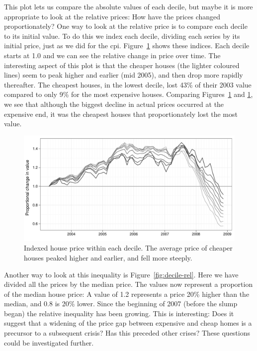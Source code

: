 \documentclass[oneside]{article}
\begin{document}
This plot lets us compare the absolute values of each decile, but maybe it is more appropriate to look at the relative prices: How have the prices changed proportionately?  One way to look at the relative price is to compare each decile to its initial value.  To do this we index each decile, dividing each series by its initial price, just as we did for the {\sc cpi}. Figure~\ref{fig:decile-ind} shows these indices.  Each decile starts at 1.0 and we can see the relative change in price over time.  The interesting aspect of this plot is that the cheaper houses (the lighter coloured lines) seem to peak higher and earlier (mid 2005), and then drop more rapidly thereafter.  The cheapest houses, in the lowest decile, lost 43\% of their 2003 value compared to only 9\% for the most expensive houses. Comparing Figures~\ref{fig:decile-ind} and \ref{fig:decile-ind}, we see that although the biggest decline in actual prices occurred at the expensive end, it was the cheapest houses that proportionately lost the most value. 

\begin{figure}[htbp]
  \centering
  \includegraphics[width=0.75\linewidth]{decile-ind}
  \caption{Indexed house price within each decile.  The average price of cheaper houses peaked higher and earlier, and fell more steeply.}
  \label{fig:decile-ind}
\end{figure}

Another way to look at this inequality is Figure~\ref{fig:decile-rel}.  Here we have divided all the prices by the median price.  The values now represent a proportion of the median house price: A value of 1.2 represents a price 20\% higher than the median, and 0.8 is 20\% lower. Since the beginning of 2007 (before the slump began) the relative inequality has been growing.  This is interesting: Does it suggest that a widening of the price gap between expensive and cheap homes is a precursor to a subsequent crisis? Has this preceded other crises? These questions could be investigated further.
\end{document}
